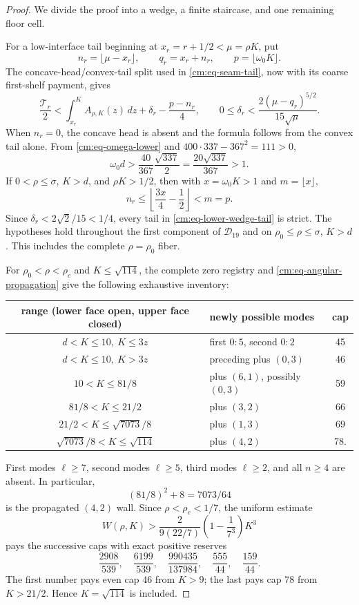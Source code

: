 \documentclass[11pt]{article}
\numberwithin{equation}{section}
\theoremstyle{definition}
\theoremstyle{remark}
\begin{document}
\begin{proof}
We divide the proof into a wedge, a finite staircase, and one remaining
floor cell.

For a low-interface tail beginning at \(x_r=r+1/2<\mu=\rho K\), put
\[
 n_r=\lfloor\mu-x_r\rfloor,\qquad
 q_r=x_r+n_r,\qquad p=\lfloor\omega_0K\rfloor.
\]
The concave-head/convex-tail split used in
\eqref{cm:eq-seam-tail}, now with its coarse first-shelf payment, gives
\begin{equation}
 \frac{\mathcal T_r}{2}
 <\int_{x_r}^K A_{\rho,K}(z)\,dz
 +\delta_r-\frac{p-n_r}{4},
 \qquad
 0\leq\delta_r<
 \frac{2(\mu-q_r)^{5/2}}{15\sqrt\mu}.
 \label{cm:eq-lower-wedge-tail}
\end{equation}
When \(n_r=0\), the concave head is absent and the formula follows from
the convex tail alone.  From \eqref{cm:eq-omega-lower} and
\(400\cdot337-367^2=111>0\),
\[
 \omega_0d>
 \frac{40}{367}\frac{\sqrt{337}}2
 =\frac{20\sqrt{337}}{367}>1.
\]
If
\(0<\rho\leq\sigma\), \(K>d\), and \(\rho K>1/2\), then with
\(x=\omega_0K>1\) and \(m=\lfloor x\rfloor\),
\[
 n_r\leq\left\lfloor\frac{3x}{4}-\frac12\right\rfloor<m=p.
\]
Since \(\delta_r<2\sqrt2/15<1/4\), every tail in
\eqref{cm:eq-lower-wedge-tail} is strict.  The hypotheses hold throughout
the first component of \(\mathcal D_{19}\) and on
\(\rho_0\leq\rho\leq\sigma\), \(K>d\).  This includes the complete
\(\rho=\rho_0\) fiber.

For \(\rho_0<\rho<\rho_c\) and \(K\leq\sqrt{114}\), the complete zero
registry and \eqref{cm:eq-angular-propagation} give the following exhaustive
inventory:
\begin{center}
\small
\begin{tabular}{c|l|c}
range (lower face open, upper face closed)&newly possible modes&cap\\ \hline
\(d<K\leq10,\ K\leq3z\)&first \(0{:}5\), second \(0{:}2\)&45\\
\(d<K\leq10,\ K>3z\)&preceding plus \((0,3)\)&46\\
\(10<K\leq81/8\)&plus \((6,1)\), possibly \((0,3)\)&59\\
\(81/8<K\leq21/2\)&plus \((3,2)\)&66\\
\(21/2<K\leq\sqrt{7073}/8\)&plus \((1,3)\)&69\\
\(\sqrt{7073}/8<K\leq\sqrt{114}\)&plus \((4,2)\)&78.
\end{tabular}
\end{center}
First modes \(\ell\geq7\), second modes \(\ell\geq5\), third modes
\(\ell\geq2\), and all \(n\geq4\) are absent.  In particular,
\[
 (81/8)^2+8=7073/64
\]
is the propagated \((4,2)\) wall.  Since \(\rho<\rho_c<1/7\), the
uniform estimate
\[
 W(\rho,K)>
 \frac{2}{9(22/7)}\left(1-\frac1{7^3}\right)K^3
\]
pays the successive caps with exact positive reserves
\[
 \frac{2908}{539},\quad\frac{6199}{539},\quad
 \frac{990435}{137984},\quad\frac{555}{44},\quad\frac{159}{44}.
\]
The first number pays even cap \(46\) from \(K>9\); the last pays cap
\(78\) from \(K>21/2\).  Hence \(K=\sqrt{114}\) is included.


\end{proof}
\end{document}
